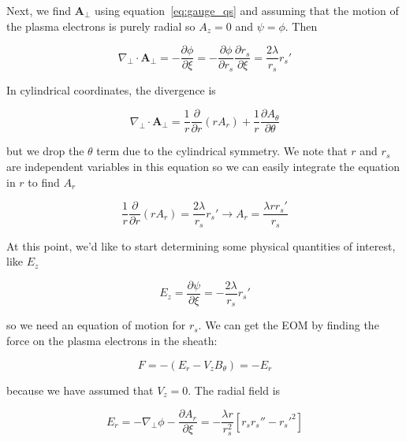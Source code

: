 \documentclass[aps,prl,preprint,groupedaddress]{revtex4-1}
\begin{document}
Next, we find $\mathbf{A}_{\perp}$ using equation~\ref{eq:gauge_qs} and assuming that the motion of the plasma electrons is purely radial so $A_z = 0$ and $\psi = \phi$. Then

\begin{equation}\label{eq:a_perp}
\nabla_\perp \cdot \mathbf{A}_\perp = -\frac{\partial \phi}{\partial \xi} = - \frac{\partial \phi}{\partial r_s}\frac{\partial r_s}{\partial \xi} = \frac{2\lambda}{r_s}r_s'
\end{equation}

In cylindrical coordinates, the divergence is

\begin{equation}\label{eq:a_perp_cyl}
\nabla_\perp \cdot \mathbf{A}_\perp = \frac{1}{r}\frac{\partial}{\partial r} (r A_r) + \frac{1}{r}\frac{\partial A_{\theta}}{\partial \theta}
\end{equation}

but we drop the $\theta$ term due to the cylindrical symmetry. We note that $r$ and $r_s$ are independent variables in this equation so we can easily integrate the equation in $r$ to find $A_r$

\begin{equation}\label{eq:a_r}
\frac{1}{r}\frac{\partial}{\partial r} (r A_r) = \frac{2\lambda}{r_s}r_s' \rightarrow A_r = \frac{\lambda r r_s'}{r_s}
\end{equation}

At this point, we'd like to start determining some physical quantities of interest, like $E_z$

\begin{equation}\label{eq:E_z}
E_z = \frac{\partial \psi}{\partial \xi} = -\frac{2\lambda}{r_s}r_s'
\end{equation}

so we need an equation of motion for $r_s$. We can get the EOM by finding the force on the plasma electrons in the sheath:

\begin{equation}\label{eq:force}
F =-(E_r -V_z B_{\theta}) = -E_r
\end{equation}

because we have assumed that $V_z = 0$. The radial field is

\begin{equation}\label{eq:force}
E_r =-\nabla_{\perp} \phi - \frac{\partial A_r}{\partial \xi} = -\frac{\lambda r}{r_s^2}[r_s r_s'' - r_s'^2]
\end{equation}
\end{document}
